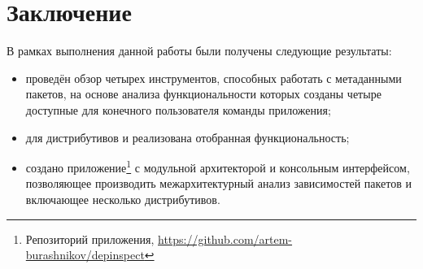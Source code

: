 
\section*{Заключение}
В рамках выполнения данной работы были получены следующие результаты:

\begin{itemize}
	\item проведён обзор четырех инструментов, способных работать с метаданными пакетов, на основе анализа функциональности которых созданы четыре доступные для конечного пользователя команды приложения;
	\item для дистрибутивов {\ubuntu} и {\fedora} реализована отобранная функциональность;
	\item создано приложение\footnote{Репозиторий приложения, \href{https://github.com/artem-burashnikov/depinspect}{https://github.com/artem-burashnikov/depinspect}} с модульной архитекторой и консольным интерфейсом, позволяющее производить межархитектурный анализ зависимостей пакетов и включающее несколько дистрибутивов.
\end{itemize}
